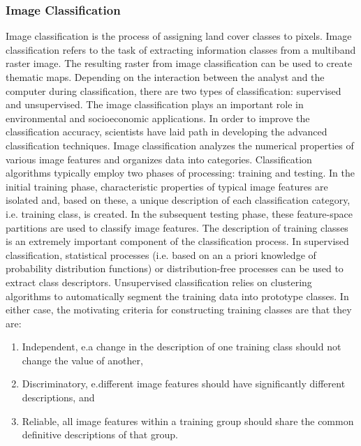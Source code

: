 \documentclass{article}
\begin{document}
\subsubsection{Image Classification}
Image classification is the process of assigning land cover classes to pixels. Image classification refers to the task of extracting information classes from a multiband raster image. The resulting raster from image classification can be used to create thematic maps. Depending on the interaction between the analyst and the computer during classification, there are two types of classification: supervised and unsupervised. The image classification plays an important role in environmental and socioeconomic applications. In order to improve the classification accuracy, scientists have laid path in developing the advanced classification techniques.
Image classification analyzes the numerical properties of various image features and organizes data into categories. Classification algorithms typically employ two phases of processing: training and testing. In the initial training phase, characteristic properties of typical image features are isolated and, based on these, a unique description of each classification category, i.e. training class, is created. In the subsequent testing phase, these feature-space partitions are used to classify image features. The description of training classes is an extremely important component of the classification process. In supervised classification, statistical processes (i.e. based on an a priori knowledge of probability distribution functions) or distribution-free processes can be used to extract class descriptors. Unsupervised classification relies on clustering algorithms to automatically segment the training data into prototype classes. In either case, the motivating criteria for constructing training classes are that they are:
\begin{enumerate}
\item Independent, e.a change in the description of one training class should not change the value of another,
\item Discriminatory, e.different image features should have significantly different descriptions, and
\item Reliable, all image features within a training group should share the common definitive descriptions of that group.
\end{enumerate}
\end{document}
